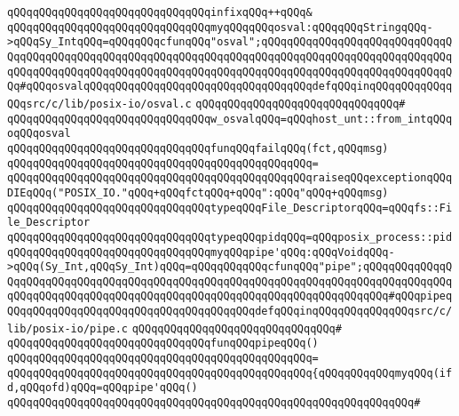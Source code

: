 \verb|qQQqqQQqqQQqqQQqqQQqqQQqqQQqqQQqinfixqQQq++qQQq&|\newline
\newline
\newline
\verb|qQQqqQQqqQQqqQQqqQQqqQQqqQQqqQQqmyqQQqqQQqosval:qQQqqQQqStringqQQq->qQQqSy_IntqQQq=qQQqqQQqcfunqQQq"osval";qQQqqQQqqQQqqQQqqQQqqQQqqQQqqQQqqQQqqQQqqQQqqQQqqQQqqQQqqQQqqQQqqQQqqQQqqQQqqQQqqQQqqQQqqQQqqQQqqQQqqQQqqQQqqQQqqQQqqQQqqQQqqQQqqQQqqQQqqQQqqQQqqQQqqQQqqQQqqQQqqQQqqQQqqQQq#qQQqosvalqQQqqQQqqQQqqQQqqQQqqQQqqQQqqQQqqQQqdefqQQqinqQQqqQQqqQQqqQQqsrc/c/lib/posix-io/osval.c|\newline
\verb|qQQqqQQqqQQqqQQqqQQqqQQqqQQqqQQq#|\newline
\verb|qQQqqQQqqQQqqQQqqQQqqQQqqQQqqQQqw_osvalqQQq=qQQqhost_unt::from_intqQQqoqQQqosval|\newline
\newline
\verb|qQQqqQQqqQQqqQQqqQQqqQQqqQQqqQQqfunqQQqfailqQQq(fct,qQQqmsg)|\newline
\verb|qQQqqQQqqQQqqQQqqQQqqQQqqQQqqQQqqQQqqQQqqQQqqQQq=|\newline
\verb|qQQqqQQqqQQqqQQqqQQqqQQqqQQqqQQqqQQqqQQqqQQqqQQqraiseqQQqexceptionqQQqDIEqQQq("POSIX_IO."qQQq+qQQqfctqQQq+qQQq":qQQq"qQQq+qQQqmsg)|\newline
\newline
\verb|qQQqqQQqqQQqqQQqqQQqqQQqqQQqqQQqtypeqQQqFile_DescriptorqQQq=qQQqfs::File_Descriptor|\newline
\verb|qQQqqQQqqQQqqQQqqQQqqQQqqQQqqQQqtypeqQQqpidqQQq=qQQqposix_process::pid|\newline
\newline
\verb|qQQqqQQqqQQqqQQqqQQqqQQqqQQqqQQqmyqQQqpipe'qQQq:qQQqVoidqQQq->qQQq(Sy_Int,qQQqSy_Int)qQQq=qQQqqQQqqQQqcfunqQQq"pipe";qQQqqQQqqQQqqQQqqQQqqQQqqQQqqQQqqQQqqQQqqQQqqQQqqQQqqQQqqQQqqQQqqQQqqQQqqQQqqQQqqQQqqQQqqQQqqQQqqQQqqQQqqQQqqQQqqQQqqQQqqQQqqQQqqQQqqQQqqQQqqQQq#qQQqpipeqQQqqQQqqQQqqQQqqQQqqQQqqQQqqQQqqQQqqQQqdefqQQqinqQQqqQQqqQQqqQQqsrc/c/lib/posix-io/pipe.c|\newline
\verb|qQQqqQQqqQQqqQQqqQQqqQQqqQQqqQQq#|\newline
\verb|qQQqqQQqqQQqqQQqqQQqqQQqqQQqqQQqfunqQQqpipeqQQq()|\newline
\verb|qQQqqQQqqQQqqQQqqQQqqQQqqQQqqQQqqQQqqQQqqQQqqQQq=|\newline
\verb|qQQqqQQqqQQqqQQqqQQqqQQqqQQqqQQqqQQqqQQqqQQqqQQq{qQQqqQQqqQQqmyqQQq(ifd,qQQqofd)qQQq=qQQqpipe'qQQq()|\newline
\verb|qQQqqQQqqQQqqQQqqQQqqQQqqQQqqQQqqQQqqQQqqQQqqQQqqQQqqQQqqQQqqQQq#|\newline
